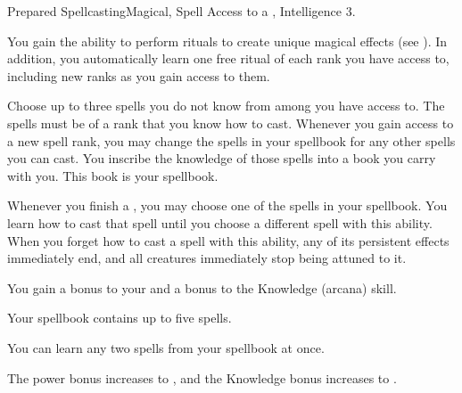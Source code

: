   \begin{magicalfeat}{Prepared Spellcasting}{Magical, Spell}
    \featpre Access to a , Intelligence 3.

     You gain the ability to perform rituals to create unique magical effects (see ).
    In addition, you automatically learn one free ritual of each rank you have access to, including new ranks as you gain access to them.

     Choose up to three spells you do not know from among  you have access to.
    The spells must be of a rank that you know how to cast.
    Whenever you gain access to a new spell rank, you may change the spells in your spellbook for any other spells you can cast.
    You inscribe the knowledge of those spells into a book you carry with you.
    This book is your spellbook.

    Whenever you finish a , you may choose one of the spells in your spellbook.
    You learn how to cast that spell until you choose a different spell with this ability.
    When you forget how to cast a spell with this ability, any of its persistent effects immediately end, and all creatures immediately stop being attuned to it.

     You gain a  bonus to your  and a  bonus to the Knowledge (arcana) skill.

     Your spellbook contains up to five spells.

     You can learn any two spells from your spellbook at once.

     The power bonus increases to , and the Knowledge bonus increases to .
  \end{magicalfeat}

